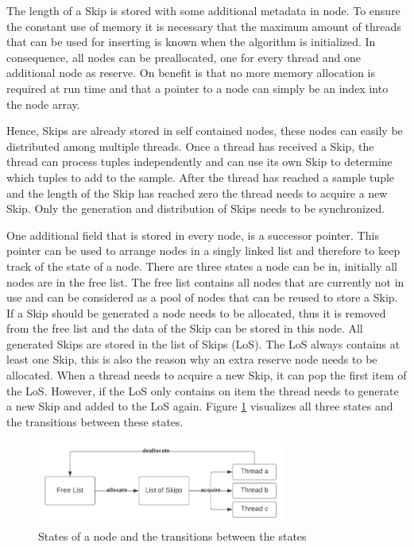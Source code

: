 \documentclass[sigconf,nonacm]{acmart}
\begin{document}
        The length of a Skip is stored with some additional metadata in node. To ensure the constant use of memory it is necessary that the maximum amount of threads that can be used for inserting is known when the algorithm is initialized. In consequence, all nodes can be preallocated, one for every thread and one additional node as reserve. On benefit is that no more memory allocation is required at run time and that a pointer to a node can simply be an index into the node array.

        Hence, Skips are already stored in self contained nodes, these nodes can easily be distributed among multiple threads. Once a thread has received a Skip, the thread can process tuples independently and can use its own Skip to determine which tuples to add to the sample. After the thread has reached a sample tuple and the length of the Skip has reached zero the thread needs to acquire a new Skip. Only the generation and distribution of Skips needs to be synchronized.

        One additional field that is stored in every node, is a successor pointer. This pointer can be used to arrange nodes in a singly linked list and therefore to keep track of the state of a node. There are three states a node can be in, initially all nodes are in the free list. The free list contains all nodes that are currently not in use and can be considered as a pool of nodes that can be reused to store a Skip. If a Skip should be generated a node needs to be allocated, thus it is removed from the free list and the data of the Skip can be stored in this node. All generated Skips are stored in the list of Skips (LoS). The LoS always contains at least one Skip, this is also the reason why an extra reserve node needs to be allocated. When a thread needs to acquire a new Skip, it can pop the first item of the LoS. However, if the LoS only contains on item the thread needs to generate a new Skip and added to the LoS again. Figure \ref{fig:lifecycle} visualizes all three states and the transitions between these states.
        \begin{figure}[H]
            \includegraphics[height=2.8cm]{figure2.pdf}
            \caption{States of a node and the transitions between the states}
            \label{fig:lifecycle}
        \end{figure}
\end{document}
